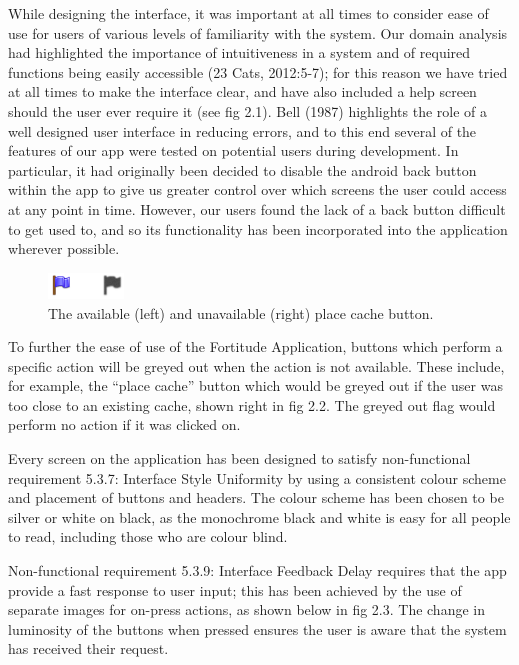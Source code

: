 While designing the interface, it was important at all times to consider ease of use for users of various levels of familiarity with the system. Our domain analysis had highlighted the importance of intuitiveness in a system and of required functions being easily accessible (23 Cats, 2012:5-7); for this reason we have tried at all times to make the interface clear, and have also included a help screen should the user ever require it (see fig 2.1). Bell (1987) highlights the role of a well designed user interface in reducing errors, and to this end several of the features of our app were tested on potential users during development. In particular, it had originally been decided to disable the android back button within the app to give us greater control over which screens the user could access at any point in time. However, our users found the lack of a back button difficult to get used to, and so its functionality has been incorporated into the application wherever possible.

\begin{figure}
	\vspace{-25pt}
	\begin{center}
	\includegraphics[width=0.18\textwidth]{images/flags_greye}
	\caption{The available (left) and unavailable (right) place cache button.}
	\label{flags_greye}
	\end{center}
	\vspace{-10pt}
\end{figure}

To further the ease of use of the Fortitude Application, buttons which perform a specific action will be greyed out when the action is not available. These include, for example, the ``place cache'' button which would be greyed out if the user was too close to an existing cache, shown right in fig 2.2. The greyed out flag would perform no action if it was clicked on.

Every screen on the application has been designed to satisfy non-functional requirement 5.3.7: Interface Style Uniformity by using a consistent colour scheme and placement of buttons and headers. The colour scheme has been chosen to be silver or white on black, as the monochrome black and white is easy for all people to read, including those who are colour blind.

Non-functional requirement 5.3.9: Interface Feedback Delay requires that the app provide a fast response to user input; this has been achieved by the use of separate images for on-press actions, as shown below in fig 2.3. The change in luminosity of the buttons when pressed ensures the user is aware that the system has received their request.

